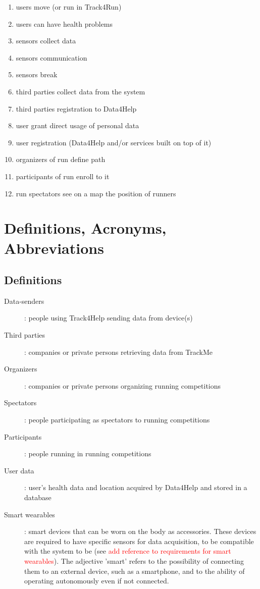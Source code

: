 \documentclass{report}
\newcommand\todo[1]{\textcolor{red}{#1}}
\begin{document}
		\begin{enumerate}
		\item users move (or run in Track4Run)
		\item users can have health problems
		\item sensors collect data
		\item sensors communication
		\item sensors break
		\item third parties collect data from the system
		\item third parties registration to Data4Help
		\item user grant direct usage of personal data
		\item user registration (Data4Help and/or services built on top of it)
		\item organizers of run define path
		\item participants of run enroll to it
		\item run spectators see on a map the position of runners
		
		\end{enumerate}
		\section{Definitions, Acronyms, Abbreviations}
		\subsection{Definitions}
		\begin{description}
			\item[Data-senders]: people using Track4Help sending data from device(s)
			\item[Third parties]: companies or private persons retrieving data from TrackMe
			\item[Organizers]: companies or private persons organizing running competitions
			\item[Spectators]: people participating as spectators to running competitions
			\item[Participants]: people running in running competitions
			\item[User data]: user's health data and location acquired by Data4Help and stored in a database
			\item[Smart wearables]: smart devices that can be worn on the body as accessories. These devices are required to have specific sensors for data acquisition, to be compatible with the system to be (see \todo{add reference to requirements for smart wearables}). The adjective 'smart' refers to the possibility of connecting them to an external device, such as a smartphone, and to the ability of operating autonomously even if not connected.
		\end{description}
\end{document}
